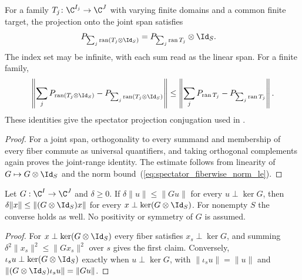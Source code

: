 \begin{lemma}
    \label{thm:euclidean_fiberwise_projection}
    \leanok
    For a family $T_j\colon\C^{I_j}\to\C^J$ with varying finite domains and a
    common finite target, the projection onto the joint span satisfies
    \begin{align}
        P_{\sum_j\operatorname{ran}(T_j\otimes\Id_S)}
         & =P_{\sum_j\operatorname{ran}T_j}\otimes\Id_S.
    \end{align}
    The index set may be infinite, with each sum read as the linear span. For a
    finite family,
    \begin{align}
        \left\|\sum_jP_{\operatorname{ran}(T_j\otimes\Id_S)}
        -P_{\sum_j\operatorname{ran}(T_j\otimes\Id_S)}\right\|
        \leq
        \left\|\sum_jP_{\operatorname{ran}T_j}
        -P_{\sum_j\operatorname{ran}T_j}\right\|.
    \end{align}
    These identities give the spectator projection conjugation used in
    \cite[Lemma~commutation(i)]{Nachtergaele1996Spectral}.
\end{lemma}
\begin{proof}\leanok
    For a joint span, orthogonality to every summand and membership of every
    fiber commute as universal quantifiers, and taking orthogonal complements
    again proves the joint-range identity. The estimate follows from linearity
    of $G\mapsto G\otimes\Id_S$ and the norm
    bound~(\ref{eq:spectator_fiberwise_norm_le}).
\end{proof}

\begin{lemma}
    \label{thm:perturbations_fiberwise_gap}
    \leanok
    Let $G:\C^I\to\C^J$ and $\delta\ge0$. If $\delta\lVert u\rVert\le\lVert Gu\rVert$
    for every $u\perp\ker G$, then
    $\delta\lVert x\rVert\le\lVert(G\otimes\Id_S)x\rVert$ for every
    $x\perp\ker(G\otimes\Id_S)$. For nonempty $S$ the converse holds as well. No
    positivity or symmetry of $G$ is assumed.
\end{lemma}
\begin{proof}
    \leanok
    For $x\perp\ker(G\otimes\Id_S)$ every fiber satisfies $x_s\perp\ker G$, and
    summing $\delta^2\lVert x_s\rVert^2\le\lVert Gx_s\rVert^2$ over $s$ gives the
    first claim. Conversely, $\iota_su\perp\ker(G\otimes\Id_S)$ exactly when
    $u\perp\ker G$, with $\lVert\iota_su\rVert=\lVert u\rVert$ and
    $\lVert(G\otimes\Id_S)\iota_su\rVert=\lVert Gu\rVert$.
\end{proof}

